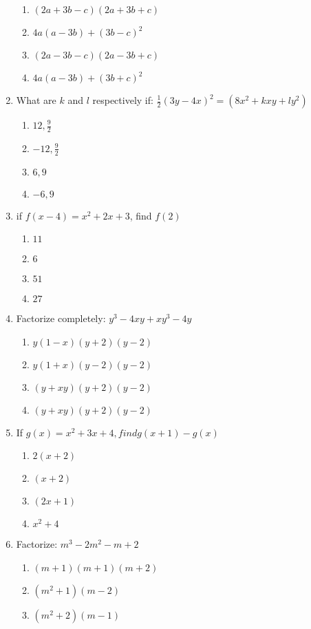 \begin{multicols}{2}
\begin{enumerate}[label={\arabic*.}]
	\begin{enumerate}[label={\Alph*.}]
	\item \((2a+3b-c)(2a+3b+c)\)
	\item \(4a(a-3b)+(3b-c)^2\)
	\item \((2a-3b-c)(2a-3b+c)\)
	\item \(4a(a-3b) + (3b+c)^2\)
	\end{enumerate}
\item What are \(k\) and \(l\) respectively if: \(\frac{1}{2}(3y-4x)^2 = (8x^2+kxy+ly^2)\)
	\begin{enumerate}[label={\Alph*.}]
	\item \(12, \frac{9}{2}\)
	\item \(-12, \frac{9}{2}\)
	\item \(6, 9\)
	\item \(-6, 9\)
	\end{enumerate}
\item if \(f(x-4) = x^2+2x+3\), find \(f(2)\)
	\begin{enumerate}[label={\Alph*.}]
	\item \(11\)
	\item \(6\)
	\item \(51\)
	\item \(27\)
	\end{enumerate}
\item Factorize completely: \(y^3-4xy+xy^3-4y\)
	\begin{enumerate}[label={\Alph*.}]
	\item \(y(1-x)(y+2)(y-2)\)
	\item \(y(1+x)(y-2)(y-2)\)
	\item \((y+xy)(y+2)(y-2)\)
	\item \((y+xy)(y+2)(y-2)\)
	\end{enumerate}
\item If \(g(x) = x^2+3x+4, find g(x+1) -g(x)\)
	\begin{enumerate}[label={\Alph*.}]
	\item \(2(x+2)\)
	\item \((x+2)\)
	\item \((2x+1)\)
	\item \(x^2+4\)
	\end{enumerate}
\item Factorize: \(m^3-2m^2-m+2\)
	\begin{enumerate}[label={\Alph*.}]
	\item \((m+1)(m+1)(m+2)\)
	\item \((m^2+1)(m-2)\)
	\item \((m^2+2)(m-1)\)

\end{enumerate}
\end{enumerate}
\end{multicols}
